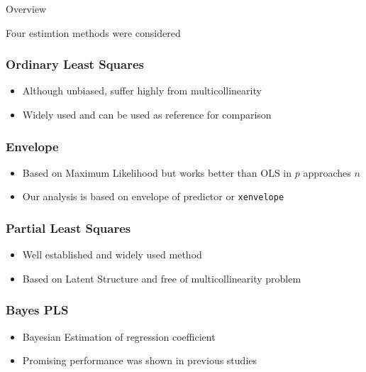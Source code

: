 \documentclass[ignorenonframetext,]{beamer}
\providecommand{\tightlist}{%
  \setlength{\itemsep}{0pt}\setlength{\parskip}{0pt}}
\begin{document}
\begin{frame}[fragile]{Overview}

\begin{block}{Four estimtion methods were considered}

\hypertarget{left}{}
\subsubsection{Ordinary Least Squares}\label{ordinary-least-squares}

\begin{itemize}
\tightlist
\item
  Although unbiased, suffer highly from multicollinearity
\item
  Widely used and can be used as reference for comparison
\end{itemize}

\subsubsection{Envelope}\label{envelope}

\begin{itemize}
\tightlist
\item
  Based on Maximum Likelihood but works better than OLS in \(p\)
  approaches \(n\)
\item
  Our analysis is based on envelope of predictor or \texttt{xenvelope}
\end{itemize}

\hypertarget{right}{}
\subsubsection{Partial Least Squares}\label{partial-least-squares}

\begin{itemize}
\tightlist
\item
  Well established and widely used method
\item
  Based on Latent Structure and free of multicollinearity problem
\end{itemize}

\subsubsection{Bayes PLS}\label{bayes-pls}

\begin{itemize}
\tightlist
\item
  Bayesian Estimation of regression coefficient
\item
  Promising performance was shown in previous studies
  \citep{helland2012near}
\end{itemize}

\end{block}

\end{frame}
\end{document}

